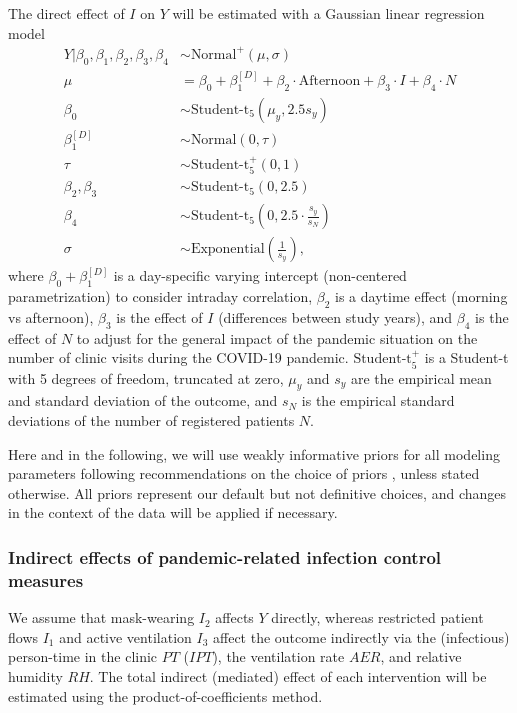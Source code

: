 \documentclass{article}
\begin{document}
The direct effect of $I$ on $Y$ will be estimated with a Gaussian linear regression model
\begin{align*}
    Y | \beta_0, \beta_1, \beta_2, \beta_3, \beta_4 &\sim \text{Normal}^{+}(\mu, \sigma) \\
    \mu &= \beta_0 + \beta_1^{[D]} + \beta_2 \cdot \text{Afternoon} + \beta_3 \cdot I + \beta_4 \cdot N \\
    \beta_0 &\sim \text{Student-t}_5\left(\mu_y, 2.5s_{y}\right) \\
    \beta_1^{[D]} &\sim \text{Normal}(0, \tau) \\
    \tau &\sim \text{Student-t}_5^{+}(0, 1) \\
    \beta_2, \beta_3 &\sim \text{Student-t}_5\left(0, 2.5\right) \\
    \beta_4 &\sim \text{Student-t}_5\left(0, 2.5\cdot \frac{s_{y}}{s_{N}}\right) \\
    \sigma &\sim \text{Exponential}\left(\frac{1}{s_{y}}\right),
\end{align*}
where $\beta_0 + \beta_1^{[D]}$ is a day-specific varying intercept (non-centered parametrization) to consider intraday correlation, $\beta_2$ is a daytime effect (morning vs afternoon), $\beta_3$ is the effect of $I$ (differences between study years), and $\beta_4$ is the effect of $N$ to adjust for the general impact of the pandemic situation on the number of clinic visits during the COVID-19 pandemic. $\text{Student-t}_{5}^{+}$ is a Student-t with 5 degrees of freedom, truncated at zero, $\mu_{y}$ and $s_{y}$ are the empirical mean and standard deviation of the outcome, and $s_N$ is the empirical standard deviations of the number of registered patients $N$. 

Here and in the following, we will use weakly informative priors for all modeling parameters following recommendations on the choice of priors \cite{Gelman2008AAS,Gelman2008StatMed,Gelman2020RegOther,Stan2022,Gabry2023Priors}, unless stated otherwise. All priors represent our default but not definitive choices, and changes in the context of the data will be applied if necessary.

\subsubsection*{Indirect effects of pandemic-related infection control measures}

We assume that mask-wearing $I_2$ affects $Y$ directly, whereas restricted patient flows $I_1$ and active ventilation $I_3$ affect the outcome indirectly via the (infectious) person-time in the clinic $PT$ ($IPT$), the ventilation rate $AER$, and relative humidity $RH$. The total indirect (mediated) effect of each intervention will be estimated using the product-of-coefficients method.
\end{document}
